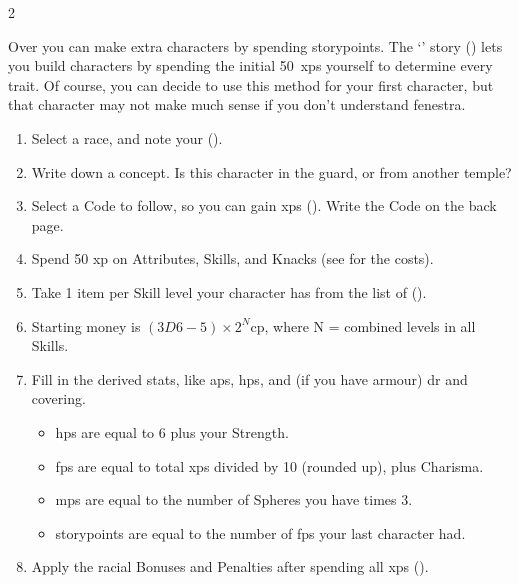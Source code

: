 \begin{multicols}{2}

\label{playerchosen}

\noindent
Over  you can make extra characters by spending \glspl{storypoint}.
The `' story () lets you build characters by spending the initial 50~\glspl{xp} yourself to determine every \gls{trait}.
Of course, you can decide to use this method for your first character, but that character may not make much sense if you don't understand \gls{fenestra}.

\begin{enumerate}
  \item\label{sumCCrace}
  Select a race, and note your  ().
  \item\label{sumCCconcept}
  Write down a concept.
  Is this character in the \gls{guard}, or from another temple?
  \item\label{sumCCcode}
  Select a Code to follow, so you can gain \glspl{xp} ().
  Write the Code on the back page.
  \item\label{sumCCxp}
  Spend 50 \gls{xp} on Attributes, Skills, and Knacks (see  for the costs).
  \item\label{sumCCequip}
  Take 1 item per Skill level your character has from the list of  ().
  \item\label{sumCCcoin}
  Starting money is $(3D6-5)\times 2^N$\gls{cp}, where N = combined levels in all Skills.
  \item\label{sumCCder}
  Fill in the derived stats, like \glspl{ap}, \glspl{hp}, and (if you have armour) \gls{dr} and \gls{covering}.
  \begin{itemize}
    \item
    \Glspl{hp} are equal to 6 plus your Strength.
    \item
    \Glspl{fp} are equal to total \glspl{xp} divided by 10 (rounded up), plus Charisma.
    \item
    \Glspl{mp} are equal to the number of Spheres you have times 3.
    \item
    \Glspl{storypoint} are equal to the number of \glspl{fp} your last character had.
  \end{itemize}
  \item\label{sumCCatt}
  Apply the racial Bonuses and Penalties after spending all \glspl{xp} ().
\end{enumerate}


\end{multicols}
